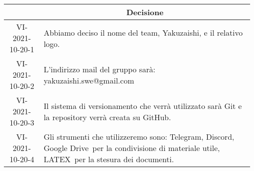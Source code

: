 \begin{table}[H]
	\centering
	\renewcommand{\arraystretch}{1.8}
	\begin{tabular}{c | p{8cm}}
		\rowcolor[HTML]{125e28}
		\multicolumn{1}{c}{\color[HTML]{FFFFFF} \textbf{ID}} &
		\multicolumn{1}{c}{\color[HTML]{FFFFFF} \textbf{Decisione}} \\
		\hline
		VI-2021-10-20-1 & Abbiamo deciso il nome del team, Yakuzaishi, e il relativo logo.  \\ \hline
		VI-2021-10-20-2 & L'indirizzo mail del gruppo sarà: yakuzaishi.swe@gmail.com \\ \hline
		VI-2021-10-20-3 & Il sistema di versionamento che verrà utilizzato sarà Git e la repository verrà creata su GitHub\glo.  \\ \hline
		VI-2021-10-20-4 & Gli strumenti che utilizzeremo sono: Telegram\glo, Discord\glo, Google Drive\glo\ per la condivisione di materiale utile, LATEX\glo\ per la stesura dei documenti.  \\
	\end{tabular}
\end{table}